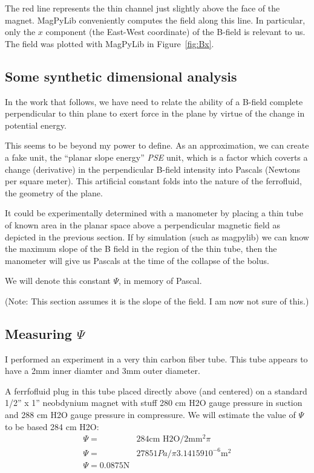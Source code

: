 \documentclass{asme2ej}
\begin{document}
The red line represents the thin channel just slightly above the face of
the magnet.
MagPyLib conveniently computes the field along this line. In particular,
only the $x$ component (the East-West coordinate) of the B-field is relevant to us.
The field was plotted with MagPyLib in Figure~\ref{fig:Bx}.

\subsection{Some synthetic dimensional analysis}

In the work that follows, we have need to relate the ability
of a B-field complete perpendicular to thin plane to exert
force in the plane by virtue of the change in potential energy.

This seems to be beyond my power to define.
As an approximation, we can create a fake unit, the
``planar slope energy'' {\em PSE} unit, which is a factor
which coverts a change (derivative) in the perpendicular B-field intensity
into Pascals (Newtons per square meter).
This artificial constant folds into the nature of the
ferrofluid, the geometry of the plane.

It could be experimentally determined with a manometer
by placing a thin tube of known area in the planar
space above a perpendicular magnetic field
as depicted in the previous section.
If by simulation (such as magpylib) we can know the
maximum slope of the B field in the region of the
thin tube, then the manometer will give us Pascals
at the time of the collapse of the bolus.

We will denote this constant $\Psi$, in memory of Pascal.

(Note: This section assumes it is the slope of the field. I am now not sure of this.)

\subsection{Measuring $\Psi$}

I performed an experiment in a very thin carbon fiber tube. This tube appears
to have a 2mm inner diamter and 3mm outer diameter.

A ferrfofluid plug in this tube placed directly above (and centered) on a
standard 1/2'' x 1'' neobdynium magnet with stuff 280 cm H2O gauge pressure
in suction and 288 cm H2O gauge pressure in compressure. We will estimate
the value of $\Psi$ to be based 284 cm H2O:
\begin{align}
  \Psi =& 284 \text{cm H2O} / 2\text{mm}^2 \pi \\
  \Psi =& 27851 Pa / \pi 3.14159 10^{-6} \text{m}^2\\
  \Psi = 0.0875 \text{N}
  \end{align}
\end{document}
